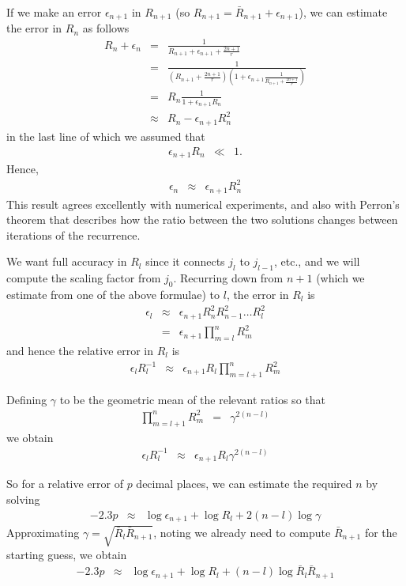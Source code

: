 \documentclass[12pt]{article}
\begin{document}
If we make an error $\epsilon_{n+1}$ in $R_{n+1}$ (so $R_{n+1} = \bar{R}_{n+1} + \epsilon_{n+1}$), we can estimate the error in $R_{n}$ as follows
\begin{eqnarray}
  R_{n} + \epsilon_{n} & = & \frac{1}{R_{n+1} + \epsilon_{n+1} + \frac{2n+1}{r}} \\
  & = & \frac{1}{\left(R_{n+1} + \frac{2n+1}{r}\right) \left(1 + \epsilon_{n+1}\frac{1}{R_{n+1} +  \frac{2n+1}{r}} \right)} \\
  & = & R_{n} \frac{1}{1 + \epsilon_{n+1} R_{n}} \\
  & \approx & R_{n} - \epsilon_{n+1} R^2_n 
\end{eqnarray}
in the last line of which we assumed that 
\begin{eqnarray}
  \epsilon_{n+1} R_{n} & \ll & 1 .
\end{eqnarray}
Hence,
\begin{eqnarray}
  \epsilon_n & \approx & \epsilon_{n+1} R^2_n
\end{eqnarray}
This result agrees excellently with numerical experiments, and also with Perron's theorem that describes how the ratio between the two solutions changes between iterations of the recurrence.

We want full accuracy in $R_l$ since it connects $j_l$ to $j_{l-1}$, etc., and we will compute the scaling factor from $j_0$.
Recurring down from $n+1$ (which we estimate from one of the above formulae) to $l$, the error in $R_l$ is
\begin{eqnarray}
  \epsilon_l & \approx & \epsilon_{n+1} R^2_n R^2_{n-1} \ldots R^2_l \\
             & = & \epsilon_{n+1} \prod_{m=l}^n R^2_m
\end{eqnarray}
and hence the relative error in $R_l$ is
\begin{eqnarray}
  \epsilon_l R_l^{-1} & \approx & \epsilon_{n+1} R_l \prod_{m=l+1}^n R^2_m
\end{eqnarray}

Defining $\gamma$ to be the geometric mean of the relevant ratios so that
\begin{eqnarray}
   \prod_{m=l+1}^n R^2_m  & = & \gamma^{2(n-l)}
\end{eqnarray}
we obtain
\begin{eqnarray}
  \epsilon_l R_l^{-1} & \approx & \epsilon_{n+1} R_l \gamma^{2(n-l)}
\end{eqnarray}

So for a relative error of $p$ decimal places, we can estimate the required $n$ by solving
\begin{eqnarray}
  -2.3 p & \approx  & \log \epsilon_{n+1} + \log R_l + 2(n-l) \log \gamma
\end{eqnarray}
Approximating $\gamma = \sqrt{\bar{R}_l \bar{R}_{n+1}}$, noting we already need to compute $\bar{R}_{n+1}$ for the starting guess, we obtain
\begin{eqnarray}
  -2.3 p & \approx  & \log \epsilon_{n+1} + \log R_l + (n-l) \log \bar{R}_l \bar{R}_{n+1}
\end{eqnarray}
\end{document}
